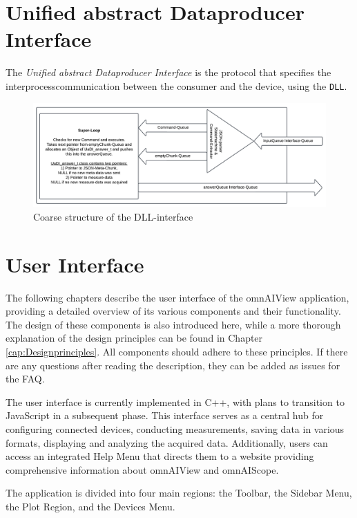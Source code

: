 \documentclass[]{scrreprt}
\begin{document}
\section[UaDI]{Unified abstract Data\-producer Interface}
The \textit{Unified abstract Data\-producer Interface} is the protocol that specifies the interprocess\-communication between the con\-sumer and the device, using the \lstinline|DLL|.


\begin{figure}
    \includegraphics[width=.9\textwidth]{./assets/pictures/interface.pdf}
    \caption[]{Coarse structure of the DLL-interface}
    \label{fig:dllinterface}
\end{figure}







\section{User Interface}


The following chapters describe the user interface of the omnAIView application, providing a detailed overview of its various components and their functionality.
 The design of these components is also introduced here, while a more thorough explanation of the design principles can be found in Chapter \ref{cap:Designprinciples}.
 All components should adhere to these principles. If there are any questions after reading the description, they can be added as issues for the FAQ.


The user interface is currently implemented in C++, with plans to transition to JavaScript in a subsequent phase. This interface serves as a central hub for configuring connected devices, conducting measurements, saving data in various formats, displaying and analyzing the acquired data. Additionally, users can access an integrated Help Menu that directs them to a website providing comprehensive information about omnAIView and omnAIScope.


The application is divided into four main regions: the Toolbar, the Sidebar Menu, the Plot Region, and the Devices Menu.
\end{document}

